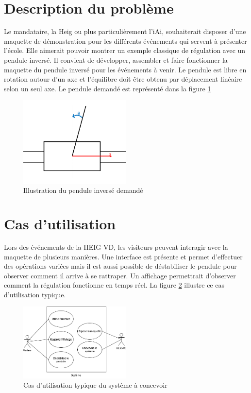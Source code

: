\section{Description du problème}\label{sec:DescProb}
Le mandataire, la \acrshort{Heig} ou plus particulièrement l'\acrshort{iAi}, souhaiterait disposer d'une maquette de démonstration pour les différents événements qui servent à présenter l'école. Elle aimerait pouvoir montrer un exemple classique de régulation avec un pendule inversé.
Il convient de développer, assembler et faire fonctionner la maquette du pendule inversé pour les événements à venir. Le pendule est libre en rotation autour d'un axe et l'équilibre doit être obtenu par déplacement linéaire selon un seul axe. Le pendule demandé est représenté dans la figure \ref{fig:Illustration}

\begin{figure}[H]
    \centering
    \includegraphics[width = 0.5\textwidth]{assets/figures/IllustrationPendule.png}
    \caption{Illustration du pendule inversé demandé}
    \label{fig:Illustration}
\end{figure}

\section{Cas d'utilisation}\label{sec:CasUtil}
Lors des événements de la HEIG-VD, les visiteurs peuvent interagir avec la maquette de plusieurs manières. Une interface est présente et permet d'effectuer des opérations variées mais il est aussi possible de déstabiliser le pendule pour observer comment il arrive à se rattraper. Un affichage permettrait d'observer comment la régulation fonctionne en temps réel.
La figure \ref{fig:CasUtil} illustre ce cas d'utilisation typique.

\begin{figure}[H]
    \centering
    \includegraphics[width = 0.5\textwidth]{assets/figures/CasUtil.png}
    \caption{Cas d'utilisation typique  du système à concevoir}
    \label{fig:CasUtil}
\end{figure}


